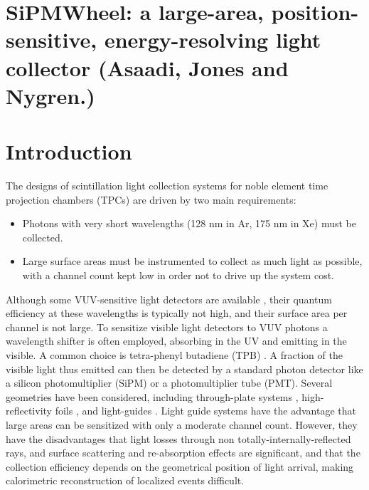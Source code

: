 
\section*{SiPMWheel: a large-area, position-sensitive, energy-resolving light collector (Asaadi, Jones and Nygren.)}

\section{Introduction}

The designs of scintillation light collection systems for noble element time projection chambers (TPCs) are driven by two main requirements:

\begin{itemize}
\item Photons with very short wavelengths (128 nm in Ar, 175 nm in Xe) must be collected.
\item Large surface areas must be instrumented to collect as much light as possible, with a channel count kept low in order not to drive up the system cost.
\end{itemize}

Although some VUV-sensitive light detectors are available \cite{Zabrodskii2015348,DeepUV}, their quantum efficiency at these wavelengths is typically not high, and their surface area per channel is not large.  To sensitize visible light detectors to VUV photons a wavelength shifter is often employed, absorbing in the UV and emitting in the visible.  A common choice is tetra-phenyl butadiene (TPB) \cite{Baptista:2013gna,Hanagodimath2008,Gehman:2013lsx,Gehman:2011xm,Burton1973,Jones:2012hm,Francini:2013Jinst}.  A fraction of the visible light thus emitted can then be detected by a standard photon detector like a silicon photomultiplier (SiPM) or a photomultiplier tube (PMT).  Several geometries have been considered, including through-plate systems \cite{Briese:2013wua,PostdocRevisited}, high-reflectivity foils \cite{Szelc:2013ooa,Kryczynski:2015pmj}, and light-guides \cite{Baptista:2012bf,Moss:2014ota,Mufson:2013zba}.  Light guide systems have the advantage that large areas can be sensitized with only a moderate channel count.  However, they have the disadvantages that light losses through non totally-internally-reflected rays, and surface scattering and re-absorption effects \cite{Jones:2013sfa} are significant, and that the collection efficiency depends on the geometrical position of light arrival, making calorimetric reconstruction of localized events difficult.

